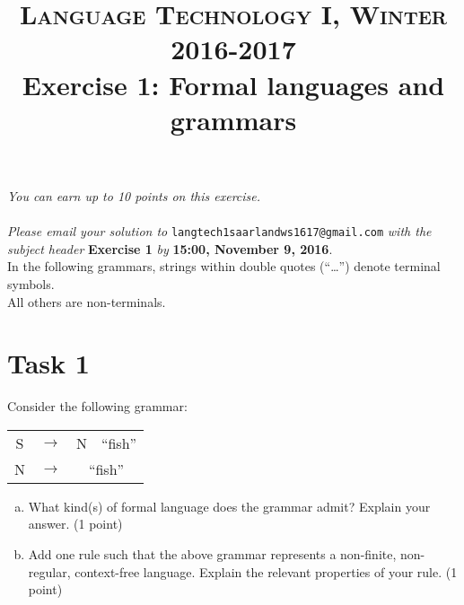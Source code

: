\documentclass[paper=a4, fontsize=11pt]{scrartcl} %
\title{	
\vspace{-1.1cm}
\normalfont \normalsize 
\textsc{Language Technology I, Winter 2016-2017} \\ [25pt] %
\huge Exercise 1: Formal languages and grammars \\ %
}
\date{} %
\numberwithin{equation}{section} %
\numberwithin{figure}{section} %
\numberwithin{table}{section} %
\begin{document}
\maketitle %


\vspace{-2cm}
\textit{You can earn up to 10 points on this exercise.\\
}\\

\textit{Please email your solution to} \texttt{langtech1saarlandws1617@gmail.com} \textit{with the subject header} \textbf{Exercise 1} \textit{by} \textbf{15:00, November 9, 2016}.\\

In the following grammars, strings within double quotes (``\ldots'') denote terminal symbols.  \\All others are non-terminals.

\vspace{3cm}

\section*{Task 1}

Consider the following grammar:

\begin{table}[h!]
\begin{center}
\begin{tabular}{c c c c}
S  & $\rightarrow$ & N & ``fish''\\
N  & $\rightarrow$ & \multicolumn{2}{c}{``fish''}\\
\end{tabular}
\end{center}
\end{table}

\begin{enumerate}[a.]
\item What kind(s) of formal language does the grammar admit? Explain your answer. (1 point)
\item Add one rule such that the above grammar represents a non-finite, non-regular, context-free language. Explain the relevant properties of your rule. (1 point)
\end{enumerate}
\end{document}
